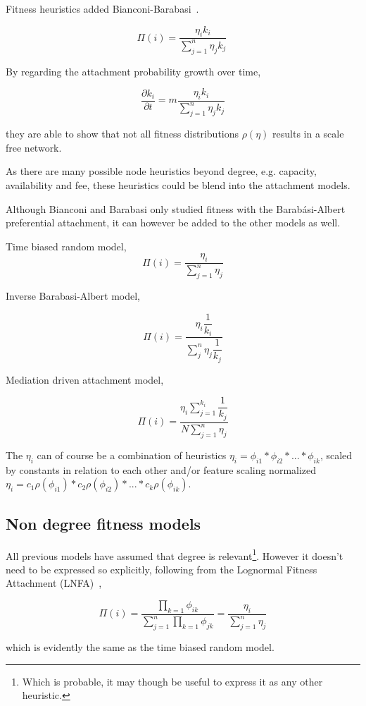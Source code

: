Fitness heuristics added Bianconi-Barabasi~\cite{bianconi:barabasi:fitness:network}.

\[ \Pi(i) = \dfrac{\eta_ik_i}{\sum_{j=1}^{n}\eta_jk_j}\ \]

By regarding the attachment probability growth over time,

\[ \dfrac{\partial k_i}{\partial t} = m \dfrac{\eta_ik_i}{\sum_{j=1}^{n}\eta_jk_j} \]

they are able to show that not all fitness distributions $\rho(\eta)$ results in a scale free network.

As there are many possible node heuristics beyond degree, e.g. capacity, availability and fee, these heuristics could be blend into the attachment models. 

Although Bianconi and Barabasi only studied fitness with the Barabási-Albert preferential attachment, it can however be added to the other models as well.

Time biased random model,
~
\[ \Pi(i) = \dfrac{\eta_i}{\sum_{j=1}^{n} \eta_j} \]

Inverse Barabasi-Albert model,

\[ \Pi(i) =  \dfrac{\eta_i\dfrac{1}{k_i}}{\sum_{j}^{n}\eta_j \dfrac{1}{k_j}} \]

Mediation driven attachment model,

\[ \Pi(i) = \dfrac{\eta_i\sum_{j=1}^{k_i}\dfrac{1}{k_j}}{N\sum_{j=1}^{n}\eta_j} \]

The $\eta_i$ can of course be a combination of heuristics $\eta_i = \phi_{i1} * \phi_{i2} * ... * \phi_{ik}$, scaled by constants in relation to each other and/or feature scaling normalized $\eta_i = c_1\rho(\phi_{i1}) * c_2\rho(\phi_{i2}) * ... * c_k\rho(\phi_{ik})$.

\subsection{Non degree fitness models}

All previous models have assumed that degree is relevant\footnote{Which is probable, it may though be useful to express it as any other heuristic.}. However it doesn't need to be expressed so explicitly, following from the Lognormal Fitness Attachment (LNFA)~\cite{bell:logonormal},

\[ \Pi(i) = \dfrac{\prod_{k=1}\phi_{ik}}{\sum_{j=1}^n\prod_{k=1} \phi_{jk}} = \dfrac{\eta_i}{\sum_{j=1}^{n} \eta_j} \]

which is evidently the same as the time biased random model. 

